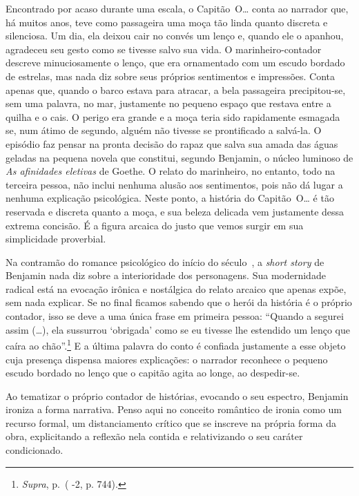 Encontrado por acaso durante uma escala, o Capitão~O\ldots{} conta ao
narrador que, há muitos anos, teve como passageira uma moça tão linda
quanto discreta e silenciosa. Um dia, ela deixou cair no convés um lenço
e, quando ele o apanhou, agradeceu seu gesto como se tivesse salvo sua
vida. O marinheiro-contador descreve minuciosamente o lenço, que era
ornamentado com um escudo bordado de estrelas, mas nada diz sobre seus
próprios sentimentos e impressões. Conta apenas que, quando o barco
estava para atracar, a bela passageira precipitou-se, sem uma palavra, no
mar, justamente no pequeno espaço que restava entre a quilha e o cais. O
perigo era grande e a moça teria sido rapidamente esmagada se, num átimo
de segundo, alguém não tivesse se prontificado a salvá-la. O episódio
faz pensar na pronta decisão do rapaz que salva sua amada das águas
geladas na pequena novela que constitui, segundo Benjamin, o núcleo
luminoso de \emph{As afinidades eletivas} de Goethe. O relato do
marinheiro, no entanto, todo na terceira pessoa, não inclui nenhuma
alusão aos sentimentos, pois não dá lugar a nenhuma explicação
psicológica. Neste ponto, a história do Capitão~O\ldots{} é tão reservada e
discreta quanto a moça, e sua beleza delicada vem justamente dessa
extrema concisão. É a figura arcaica do justo que vemos surgir em sua
simplicidade proverbial.

Na contramão do romance psicológico do início do século~, a
\emph{short story} de Benjamin nada diz sobre a interioridade dos
personagens. Sua modernidade radical está na evocação irônica e
nostálgica do relato arcaico que apenas expõe, sem nada explicar. Se no
final ficamos sabendo que o herói da história é o próprio contador, isso
se deve a uma única frase em primeira pessoa: ``Quando a segurei assim
(\ldots{}), ela sussurrou `obrigada' como se eu tivesse lhe estendido um
lenço que caíra ao chão''.\footnote{\emph{Supra}, p.\,\pageref{supra9} ( -2, p. 744).}
E a última palavra do conto é confiada justamente a esse objeto cuja
presença dispensa maiores explicações: o narrador reconhece o pequeno
escudo bordado no lenço que o capitão agita ao longe, ao despedir-se.

Ao tematizar o próprio contador de histórias, evocando o seu espectro,
Benjamin ironiza a forma narrativa. Penso aqui no conceito romântico de
ironia como um recurso formal, um distanciamento crítico que se inscreve
na própria forma da obra, explicitando a reflexão nela contida e
relativizando o seu caráter condicionado.

